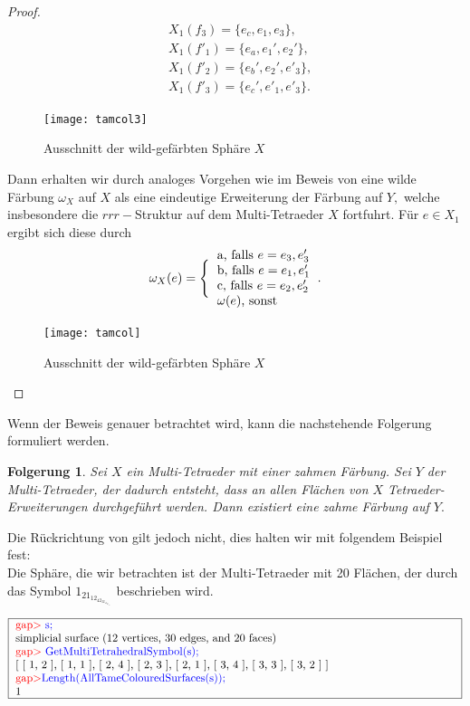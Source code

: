 \documentclass[12pt,titlepage,twoside,cleardoublepage]{article}
\theoremstyle{nummermitklammern}
\newtheorem{folgerung}[temp]{Folgerung}
\newtheorem{folgerung}[zahl]{Folgerung}
\numberwithin{equation}{section}
\begin{document}
\begin{proof}
\begin{align*}
&X_1(f_3)=\{e_c,e_1,e_3\},\\
&X_1(f'_1)=\{e_a,e_1',e_2'\},\\
&X_1(f'_2)=\{e_b',e_2',e'_3\},\\
&X_1(f'_3)=\{e_c',e'_1,e'_3\}.
\end{align*}
\begin{figure}[H]
\begin{center}
\texttt{[image: tamcol3]}
\end{center}
\caption{Ausschnitt der wild-gefärbten Sphäre $X$}
\end{figure}
Dann erhalten wir durch analoges Vorgehen wie im Beweis von  eine wilde Färbung $\omega_X$ auf $X$ als eine eindeutige Erweiterung der Färbung auf $Y,$ welche insbesondere die $rrr-$Struktur auf dem Multi-Tetraeder $X$ fortfuhrt. Für $e\in X_1$ ergibt sich diese durch 
\begin{align*}
\omega_X(e)=\Biggl\{\begin{tabular}[l]{lcr}
a, falls $e=e_3,e_3'$\\
b, falls $e=e_1,e_1'$\\
c, falls $e=e_2,e_2'$\\
$\omega(e)$, sonst
\end{tabular}.
\end{align*}

\begin{figure}[H]
\begin{center}
\texttt{[image: tamcol]}
\end{center}
\caption{Ausschnitt der wild-gefärbten Sphäre $X$}
\end{figure}
\end{proof}
Wenn der Beweis genauer betrachtet wird, kann die nachstehende Folgerung formuliert werden.
\begin{folgerung}
Sei $X$ ein Multi-Tetraeder mit einer zahmen Färbung. Sei $Y$ der Multi-Tetraeder, der dadurch entsteht, dass an allen Flächen von $X$ Tetraeder-Erweiterungen durchgeführt werden. Dann existiert eine zahme Färbung auf $Y.$
\end{folgerung}
Die Rückrichtung von  gilt jedoch nicht, dies halten wir mit folgendem Beispiel fest:\\
Die Sphäre, die wir betrachten ist der Multi-Tetraeder mit 20 Flächen, der durch das Symbol $1_21_12_42_32_13_43_33_2$ beschrieben wird.
\begin{center}
$\fbox{
\parbox{14cm}{
\textcolor{red}{gap$>$} \textcolor{blue}{s;}\newline
simplicial surface (12 vertices, 30 edges, and 20 faces)\newline
\textcolor{red}{gap$>$} \textcolor{blue}{GetMultiTetrahedralSymbol(s);}\newline
[ [ 1, 2 ], [ 1, 1 ], [ 2, 4 ], [ 2, 3 ], [ 2, 1 ], [ 3, 4 ], [ 3, 3 ],
  [ 3, 2 ] ]\newline
\textcolor{red}{gap$>$}\textcolor{blue}{ Length(AllTameColouredSurfaces(s));}\newline
1
}}$
\end{center}
\end{document}
